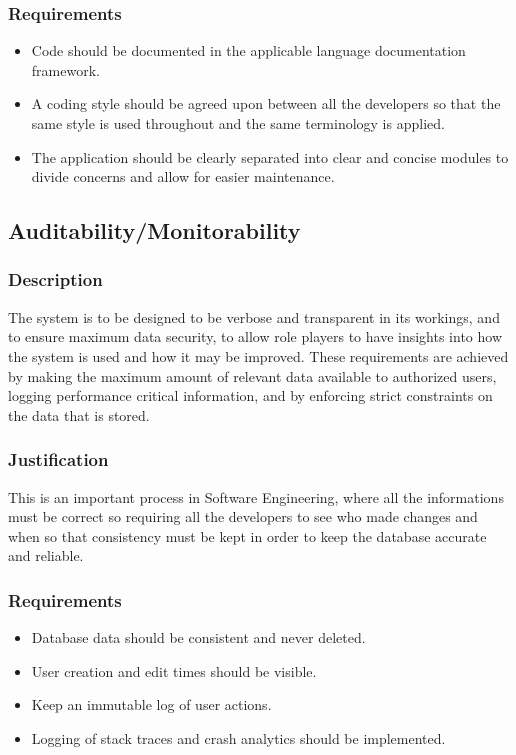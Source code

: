 \documentclass[11pt,fleqn]{book} %
\begin{document}
			\subsubsection{Requirements}
				\begin{itemize}
					\item Code should be documented in the applicable language documentation framework.
					\item A coding style should be agreed upon between all the developers so that the same style is used throughout and the same terminology is applied.
					\item The application should be clearly separated into clear and concise modules to divide concerns and allow for easier maintenance.
				\end{itemize}
		\subsection{Auditability/Monitorability}
			\subsubsection{Description}
				The system is to be designed to be verbose and transparent in its workings, and to ensure maximum data security, to allow role players to have insights into how the system is used and how it may be improved.\newline
				These requirements are achieved by making the maximum amount of relevant data available to authorized users, logging performance critical information, and by enforcing strict constraints on the data that is stored.
			\subsubsection{Justification}
				This is an important process in Software Engineering, where all the informations must be correct so requiring all the developers to see who made changes and when so that consistency must be kept in order to keep the database accurate and reliable.
			\subsubsection{Requirements}
				\begin{itemize}
					\item Database data should be consistent and never deleted.
					\item User creation and edit times should be visible.
					\item Keep an immutable log of user actions.
					\item Logging of stack traces and crash analytics should be implemented.
				\end{itemize}
\end{document}
